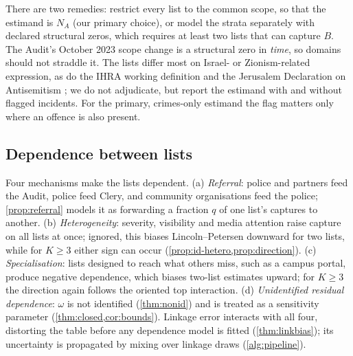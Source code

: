 There are two remedies: restrict every list to the common scope, so that the estimand is $N_A$ (our primary choice), or model the strata separately with declared structural zeros, which requires at least two lists that can capture $B$. The Audit's October 2023 scope change is a structural zero in \emph{time}, so domains should not straddle it. The lists differ most on Israel- or Zionism-related expression, as do the IHRA working definition \citep{ihra2016} and the Jerusalem Declaration on Antisemitism \citep{jda2021}; we do not adjudicate, but report the estimand with and without flagged incidents. For the primary, crimes-only estimand the flag matters only where an offence is also present.

\subsection{Dependence between lists}\label{sec:src-dependence}

Four mechanisms make the lists dependent. (a) \emph{Referral}: police and partners feed the Audit, police feed Clery, and community organisations feed the police; \cref{prop:referral} models it as forwarding a fraction $q$ of one list's captures to another. (b) \emph{Heterogeneity}: severity, visibility and media attention raise capture on all lists at once; ignored, this biases Lincoln--Petersen downward for two lists, while for $K\ge3$ either sign can occur (\cref{prop:id-hetero,prop:direction}). (c) \emph{Specialisation}: lists designed to reach what others miss, such as a campus portal, produce negative dependence, which biases two-list estimates upward; for $K\ge3$ the direction again follows the oriented top interaction. (d) \emph{Unidentified residual dependence}: $\omega$ is not identified (\cref{thm:nonid}) and is treated as a sensitivity parameter (\cref{thm:closed,cor:bounds}). Linkage error interacts with all four, distorting the table before any dependence model is fitted (\cref{thm:linkbias}); its uncertainty is propagated by mixing over linkage draws (\cref{alg:pipeline}).
